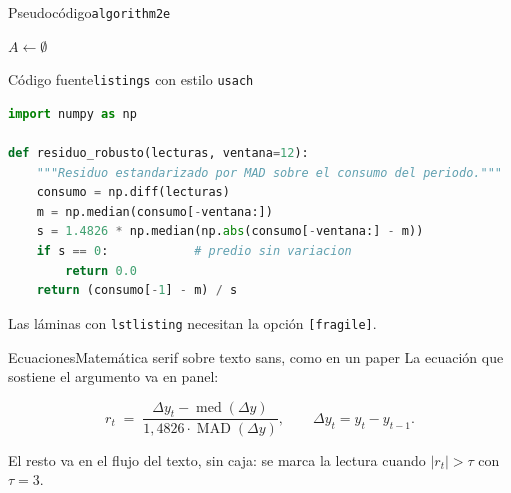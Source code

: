 \documentclass[11pt,aspectratio=169,xcolor=table]{beamer}
\begin{document}
\begin{frame}{Pseudocódigo}{\texttt{algorithm2e}}
  \begin{algorithm}[H]
    \footnotesize
    $A \leftarrow \emptyset$\;
    \;
    \caption{Detección de lecturas anómalas por residuo robusto}
  \end{algorithm}
\end{frame}

\begin{frame}[fragile]{Código fuente}{\texttt{listings} con estilo \texttt{usach}}
\begin{lstlisting}[language=Python]
import numpy as np

def residuo_robusto(lecturas, ventana=12):
    """Residuo estandarizado por MAD sobre el consumo del periodo."""
    consumo = np.diff(lecturas)
    m = np.median(consumo[-ventana:])
    s = 1.4826 * np.median(np.abs(consumo[-ventana:] - m))
    if s == 0:            # predio sin variacion
        return 0.0
    return (consumo[-1] - m) / s
\end{lstlisting}
  Las láminas con \texttt{lstlisting} necesitan la opción \texttt{[fragile]}.
\end{frame}

\begin{frame}{Ecuaciones}{Matemática serif sobre texto sans, como en un paper}
  La ecuación que sostiene el argumento va en panel:

  \begin{usachformula}
    \[
      r_t \;=\; \frac{\Delta y_t - \operatorname{med}(\Delta y)}
                     {1{,}4826 \cdot \operatorname{MAD}(\Delta y)},
      \qquad \Delta y_t = y_t - y_{t-1}.
    \]
  \end{usachformula}

  El resto va en el flujo del texto, sin caja: se marca la lectura cuando
  $|r_t| > \tau$ con $\tau = 3$.
\end{frame}
\end{document}
